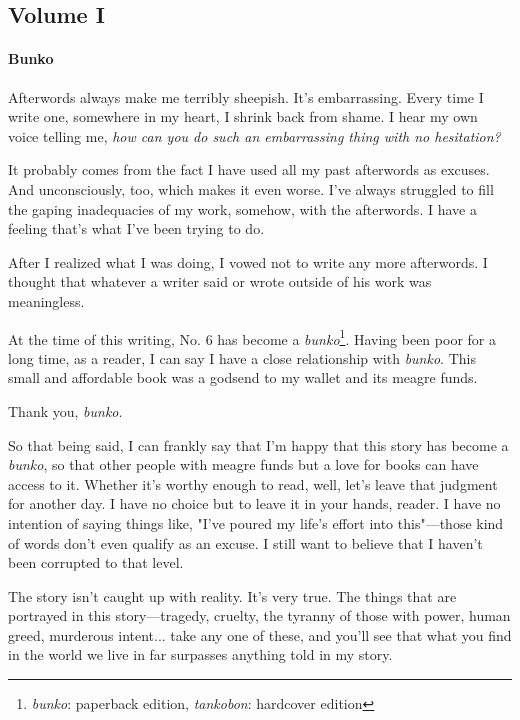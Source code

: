 
\subsection{Volume I}
\paragraph{Bunko}

Afterwords always make me terribly sheepish. It's embarrassing. Every
time I write one, somewhere in my heart, I shrink back from shame. I
hear my own voice telling me, \emph{how can you do such an embarrassing thing
with no hesitation?}

It probably comes from the fact I have used all my past afterwords as
excuses. And unconsciously, too, which makes it even worse. I've always
struggled to fill the gaping inadequacies of my work, somehow, with the
afterwords. I have a feeling that's what I've been trying to do.

After I realized what I was doing, I vowed not to write any more
afterwords. I thought that whatever a writer said or wrote outside of
his work was meaningless.

At the time of this writing, No. 6 has become a \emph{bunko}\footnote{\emph{bunko}: paperback edition, \emph{tankobon}: hardcover edition}.
Having been poor for a long time, as a reader, I can say I have a close
relationship with \emph{bunko}. This small and affordable book was a godsend to
my wallet and its meagre funds.

Thank you, \emph{bunko}.

So that being said, I can frankly say that I'm happy that this story has
become a \emph{bunko}, so that other people with meagre funds but a love for
books can have access to it. Whether it's worthy enough to read, well,
let's leave that judgment for another day. I have no choice but to leave
it in your hands, reader. I have no intention of saying things like,
"I've poured my life's effort into this"---those kind of words don't even
qualify as an excuse. I still want to believe that I haven't been
corrupted to that level.

The story isn't caught up with reality. It's very true. The things that
are portrayed in this story---tragedy, cruelty, the tyranny of those with
power, human greed, murderous intent... take any one of these, and
you'll see that what you find in the world we live in far surpasses
anything told in my story.

